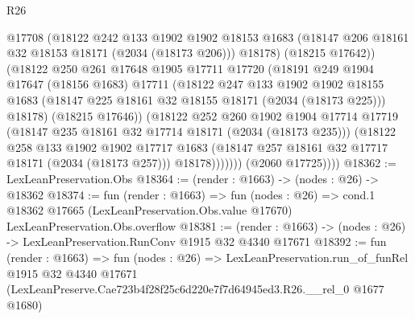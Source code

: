 \begin{lexlean}{R26}
\begin{coremodule}
                    @17708
                    (@18122
                      @242
                      @133
                      @1902
                      @1902
                      @18153
                      @1683
                      (@18147 @206 @18161 @32 @18153 @18171 (@2034 (@18173 @206)))
                      @18178)
                    (@18215 @17642))
                  (@18122
                    @250
                    @261
                    @17648
                    @1905
                    @17711
                    @17720
                    (@18191
                      @249
                      @1904
                      @17647
                      (@18156 @1683)
                      @17711
                      (@18122
                        @247
                        @133
                        @1902
                        @1902
                        @18155
                        @1683
                        (@18147 @225 @18161 @32 @18155 @18171 (@2034 (@18173 @225)))
                        @18178)
                      (@18215 @17646))
                    (@18122
                      @252
                      @260
                      @1902
                      @1904
                      @17714
                      @17719
                      (@18147 @235 @18161 @32 @17714 @18171 (@2034 (@18173 @235)))
                      (@18122
                        @258
                        @133
                        @1902
                        @1902
                        @17717
                        @1683
                        (@18147 @257 @18161 @32 @17717 @18171 (@2034 (@18173 @257)))
                        @18178)))))))
          (@2060 @17725))))
@18362 := LexLeanPreservation.Obs
@18364 := (render : @1663) -> (nodes : @26) -> @18362
@18374 := fun (render : @1663) =>
  fun (nodes : @26) =>
  cond.{1} @18362 @17665 (LexLeanPreservation.Obs.value @17670) LexLeanPreservation.Obs.overflow
@18381 := (render : @1663) -> (nodes : @26) -> LexLeanPreservation.RunConv @1915 @32 @4340 @17671
@18392 := fun (render : @1663) =>
  fun (nodes : @26) =>
  LexLeanPreservation.run_of_funRel
    @1915
    @32
    @4340
    @17671
    (LexLeanPreserve.Cae723b4f28f25c6d220e7f7d64945ed3.R26.__rel_0 @1677 @1680)
\end{coremodule}
\end{lexlean}
